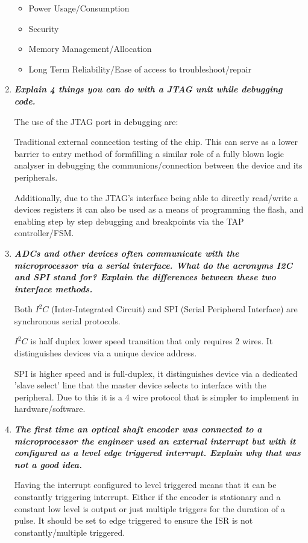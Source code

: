 \documentclass[11pt]{article}
\begin{document}
\begin{enumerate}
    \begin{itemize}
        \item Power Usage/Consumption
        \item Security
        \item Memory Management/Allocation
        \item Long Term Reliability/Ease of access to troubleshoot/repair 
    \end{itemize}
    
    \item \textit{\textbf{Explain 4 things you can do with a JTAG unit while debugging code.}}
    
    The use of the JTAG port in debugging are: 
    
    Traditional external connection testing of the chip. This can serve as a lower barrier to entry method of formfilling a similar role of a fully blown logic analyser in debugging the communions/connection between the device and its peripherals.

    Additionally, due to the JTAG's interface being able to directly read/write a devices registers it can also be used as a means of programming the flash, and enabling step by step debugging and breakpoints via the TAP controller/FSM.

    \item \textit{\textbf{ADCs and other devices often communicate with the microprocessor via a serial interface. What do the acronyms I2C and SPI stand for? Explain the differences between these two interface methods.}}

    Both $I^2C$ (Inter-Integrated Circuit) and SPI (Serial Peripheral Interface) are synchronous serial protocols.

    $I^2C$ is half duplex lower speed transition that only requires 2 wires. It distinguishes devices via a unique device address.

    SPI is higher speed and is full-duplex, it distinguishes device via a dedicated 'slave select' line that the master device selects to interface with the peripheral. Due to this it is a 4 wire protocol that is simpler to implement in hardware/software.
    
    \item \textit{\textbf{The first time an optical shaft encoder was connected to a microprocessor the engineer used an external interrupt but with it configured as a level edge triggered interrupt. Explain why that was not a good idea.}}
    
    Having the interrupt configured to level triggered means that it can be constantly triggering interrupt. Either if the encoder is stationary and a constant low level is output or just multiple triggers for the duration of a pulse. It should be set to edge triggered to ensure the ISR is not constantly/multiple triggered. 
    

\end{enumerate}
\end{document}

